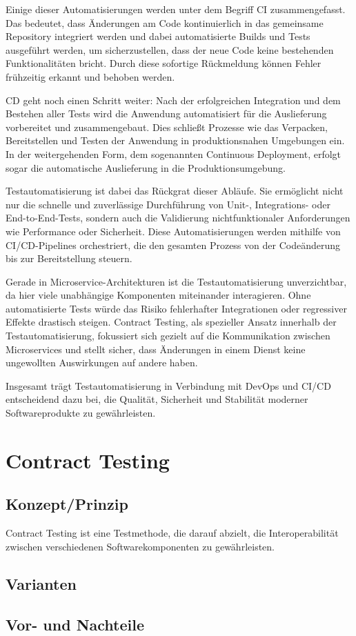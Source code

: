 Einige dieser Automatisierungen werden unter dem Begriff \gls{CI} zusammengefasst.
Das bedeutet, dass Änderungen am Code kontinuierlich in das gemeinsame Repository integriert werden und dabei
automatisierte \glspl{Build} und Tests ausgeführt werden, um sicherzustellen, dass der neue Code keine bestehenden
Funktionalitäten bricht.
Durch diese sofortige Rückmeldung können Fehler frühzeitig erkannt und behoben werden.

\Gls{CD} geht noch einen Schritt weiter: Nach der erfolgreichen Integration und dem Bestehen aller Tests wird die
Anwendung automatisiert für die Auslieferung vorbereitet und zusammengebaut.
Dies schließt Prozesse wie das Verpacken, Bereitstellen und Testen der Anwendung in produktionsnahen Umgebungen ein.
In der weitergehenden Form, dem sogenannten Continuous Deployment, erfolgt sogar die automatische Auslieferung in die Produktionsumgebung.

Testautomatisierung ist dabei das Rückgrat dieser Abläufe.
Sie ermöglicht nicht nur die schnelle und zuverlässige Durchführung von Unit-, Integrations- oder End-to-End-Tests, sondern auch die Validierung nichtfunktionaler Anforderungen wie Performance oder Sicherheit.
Diese Automatisierungen werden mithilfe von \gls{CI}/\gls{CD}-Pipelines orchestriert, die den gesamten Prozess von der Codeänderung bis zur Bereitstellung steuern.

Gerade in Microservice-Architekturen ist die Testautomatisierung unverzichtbar, da hier viele unabhängige Komponenten miteinander interagieren.
Ohne automatisierte Tests würde das Risiko fehlerhafter Integrationen oder regressiver Effekte drastisch steigen.
Contract Testing, als spezieller Ansatz innerhalb der Testautomatisierung, fokussiert sich gezielt auf die Kommunikation zwischen Microservices und stellt sicher, dass Änderungen in einem Dienst keine ungewollten Auswirkungen auf andere haben.

Insgesamt trägt Testautomatisierung in Verbindung mit \gls{DevOps} und \gls{CI}/\gls{CD} entscheidend dazu bei, die Qualität, Sicherheit und Stabilität moderner Softwareprodukte zu gewährleisten.

\section{Contract Testing}\label{sec:foundation_contracttesting}

\subsection{Konzept/Prinzip}\label{subsec:foundation_contracttesting_concept}

Contract Testing ist eine Testmethode, die darauf abzielt, die Interoperabilität zwischen verschiedenen Softwarekomponenten zu gewährleisten.

\subsection{Varianten}\label{subsec:foundation_contracttesting_variants}

\subsection{Vor- und Nachteile}\label{subsec:foundation_contracttesting_proscons}
